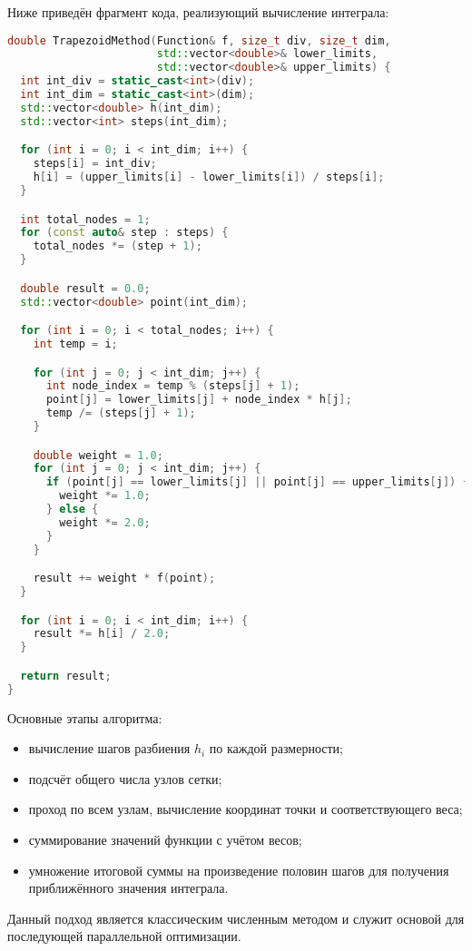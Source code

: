 \documentclass[a4paper,14pt]{article}
\begin{document}
Ниже приведён фрагмент кода, реализующий вычисление интеграла:

\begin{lstlisting}[language=C++]
double TrapezoidMethod(Function& f, size_t div, size_t dim,
                       std::vector<double>& lower_limits,
                       std::vector<double>& upper_limits) {
  int int_div = static_cast<int>(div);
  int int_dim = static_cast<int>(dim);
  std::vector<double> h(int_dim);
  std::vector<int> steps(int_dim);

  for (int i = 0; i < int_dim; i++) {
    steps[i] = int_div;
    h[i] = (upper_limits[i] - lower_limits[i]) / steps[i];
  }

  int total_nodes = 1;
  for (const auto& step : steps) {
    total_nodes *= (step + 1);
  }

  double result = 0.0;
  std::vector<double> point(int_dim);

  for (int i = 0; i < total_nodes; i++) {
    int temp = i;

    for (int j = 0; j < int_dim; j++) {
      int node_index = temp % (steps[j] + 1);
      point[j] = lower_limits[j] + node_index * h[j];
      temp /= (steps[j] + 1);
    }

    double weight = 1.0;
    for (int j = 0; j < int_dim; j++) {
      if (point[j] == lower_limits[j] || point[j] == upper_limits[j]) {
        weight *= 1.0;
      } else {
        weight *= 2.0;
      }
    }

    result += weight * f(point);
  }

  for (int i = 0; i < int_dim; i++) {
    result *= h[i] / 2.0;
  }

  return result;
}
\end{lstlisting}

Основные этапы алгоритма:
\begin{itemize}
    \item вычисление шагов разбиения $h_i$ по каждой размерности;
    \item подсчёт общего числа узлов сетки;
    \item проход по всем узлам, вычисление координат точки и соответствующего веса;
    \item суммирование значений функции с учётом весов;
    \item умножение итоговой суммы на произведение половин шагов для получения приближённого значения интеграла.
\end{itemize}

Данный подход является классическим численным методом и служит основой для последующей параллельной оптимизации.
\end{document}
